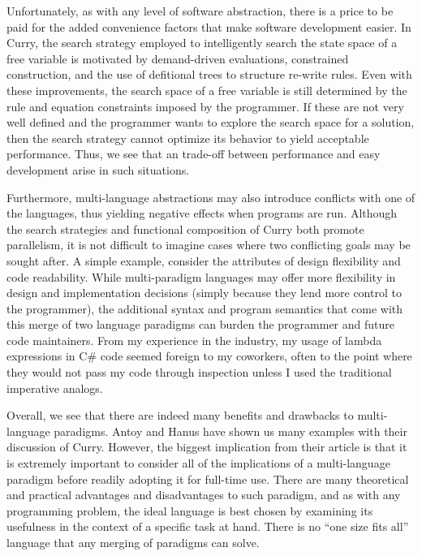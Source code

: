 \documentclass[12pt,letterpaper]{article}
\begin{document}
Unfortunately, as with any level of software abstraction, there is a price to be paid for the added 
convenience factors that make software development easier. In Curry, the search strategy employed 
to intelligently search the state space of a free variable is motivated by demand-driven evaluations, 
constrained construction, and the use of defitional trees to structure re-write rules. Even with
these improvements, the search space of a free variable is still determined by the rule and equation
constraints imposed by the programmer. If these are not very well defined and the programmer wants to 
explore the search space for a solution, then the search strategy cannot optimize its behavior to yield
acceptable performance. Thus, we see that an trade-off between performance and easy development arise
in such situations.

Furthermore, multi-language abstractions may also introduce conflicts with one of the languages, thus
yielding negative effects when programs are run. Although the search strategies and functional 
composition of Curry both promote parallelism, it is not difficult to imagine cases where two 
conflicting goals may be sought after. A simple example, consider the attributes of design 
flexibility and code readability. While multi-paradigm languages may offer more flexibility in design
and implementation decisions (simply because they lend more control to the programmer), the additional
syntax and program semantics that come with this merge of two language paradigms can burden the 
programmer and future code maintainers. From my experience in the industry, my usage of lambda 
expressions in C\# code seemed foreign to my coworkers, often to the point where they would not
pass my code through inspection unless I used the traditional imperative analogs. 


Overall, we see that there are indeed many benefits and drawbacks to multi-language paradigms. Antoy and 
Hanus have shown us many examples with their discussion of Curry. However, the biggest implication 
from their article is that it is extremely important to consider all of the implications of a 
multi-language paradigm before readily adopting it for full-time use. There are many theoretical and 
practical advantages and disadvantages to such paradigm, and as with any programming problem, 
the ideal language is best chosen by examining its usefulness in the context of a specific task at 
hand. There is no ``one size fits all'' language that any merging of paradigms can solve.




\end{document}
